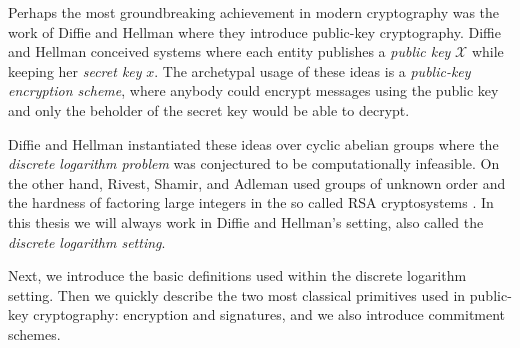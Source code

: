 Perhaps the most groundbreaking achievement in modern cryptography was the work of Diffie and Hellman \cite{DifHel76} where they introduce public-key cryptography. Diffie and Hellman conceived systems where each entity publishes a \emph{public key} $\mathcal{X}$ while keeping her \emph{secret key} $x$. The archetypal usage of these ideas is a \emph{public-key encryption scheme}, where anybody could encrypt messages using the public key and only the beholder of the secret key would be able to decrypt.

Diffie and Hellman instantiated these ideas over {cyclic abelian groups} where the \emph{discrete logarithm problem} was conjectured to be computationally infeasible. On the other hand, Rivest, Shamir, and Adleman used groups of unknown order and the hardness of factoring large integers in the so called RSA cryptosystems \cite{RivShaAdl78}.
In this thesis we will always work in Diffie and Hellman's setting, also called the \emph{discrete logarithm setting}.

Next, we introduce the basic definitions used within the discrete logarithm setting. Then we quickly describe the two most classical primitives used in public-key cryptography: encryption and signatures, and we also introduce commitment schemes.

